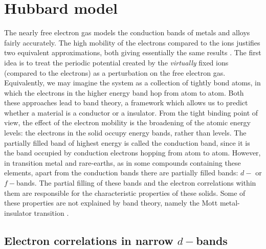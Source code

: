 \section{Hubbard model}\label{sec:hubbardModel}

The nearly free electron gas models the conduction bands of metals and alloys fairly accurately.
The high mobility of the electrons compared to the ions justifies two equivalent approximations, both giving essentially the same results \cite{ashcroft_solid_1976}.
The first idea is to treat the periodic potential created by the \emph{virtually} fixed ions (compared to the electrons) as a perturbation on the free electron gas.
Equivalently, we may imagine the system as a collection of tightly bond atoms, in which the electrons in the higher energy band hop from atom to atom.
Both these approaches lead to band theory, a framework which allows us to predict whether a material is a conductor or a insulator.
From the tight binding point of view, the effect of the electron mobility is the broadening of the atomic energy levels: the electrons in the solid occupy energy bands, rather than levels.
The partially filled band of highest energy is called the conduction band, since it is the band occupied by conduction electrons hopping from atom to atom.
However, in transition metal and rare-earths, as in some compounds containing these elements, apart from the conduction bands there are partially filled bands: $d-$ or $f-$bands.
The partial filling of these bands and the electron correlations within them are responsible for the characteristic properties of these solids.
Some of these properties are not explained by band theory, namely the Mott metal-insulator transition \cite{h_de_boer_semiconductors_1937, mott_discussion_1937, mott_basis_1949}.

\subsection{Electron correlations in narrow $d-$bands}

